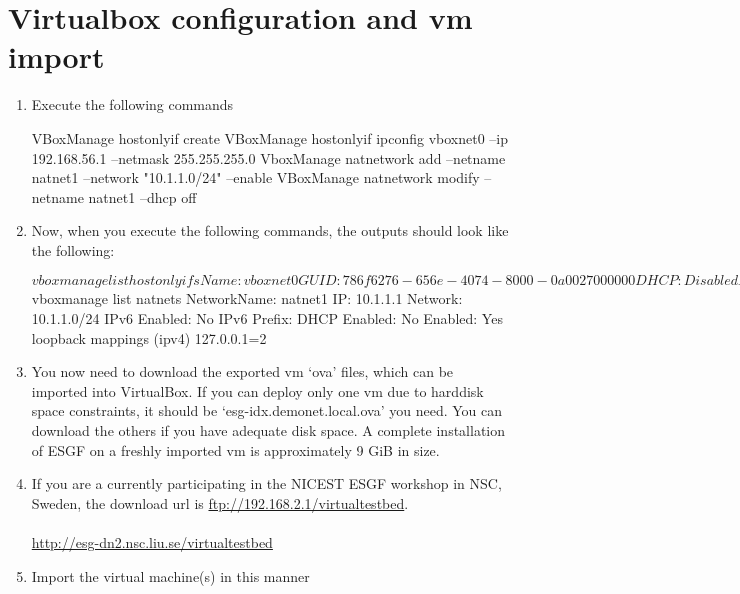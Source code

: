 \section{Virtualbox configuration and vm import}
\begin{enumerate}
\item Execute the following commands
\begin{tiny}
\begin{verbatimtab}[4]
VBoxManage hostonlyif create
VBoxManage hostonlyif ipconfig vboxnet0 --ip 192.168.56.1 --netmask 255.255.255.0
VboxManage natnetwork add --netname natnet1 --network "10.1.1.0/24" --enable
VBoxManage natnetwork modify --netname natnet1 --dhcp off
\end{verbatimtab}
\end{tiny}
\newpage
\item Now, when you execute the following commands, the outputs should look like the following:
\begin{verbatimtab}$ vboxmanage list hostonlyifs
Name:            vboxnet0
GUID:            786f6276-656e-4074-8000-0a0027000000
DHCP:            Disabled
IPAddress:       192.168.56.1
NetworkMask:     255.255.255.0
IPV6Address:     fe80:0000:0000:0000:0800:27ff:fe00:0000
IPV6NetworkMaskPrefixLength: 64
HardwareAddress: 0a:00:27:00:00:00
MediumType:      Ethernet
Status:          Up
VBoxNetworkName: HostInterfaceNetworking-vboxnet0

[pchengi@direwolf ~]$ vboxmanage list natnets
NetworkName:    natnet1
IP:             10.1.1.1
Network:        10.1.1.0/24
IPv6 Enabled:   No
IPv6 Prefix:    
DHCP Enabled:   No
Enabled:        Yes
loopback mappings (ipv4)
        127.0.0.1=2
\end{verbatimtab}
\item You now need to download the exported vm `ova' files, which can be imported into VirtualBox. If you can deploy only one vm due to harddisk space constraints, it should be `esg-idx.demonet.local.ova' you need. You can download the others if you have adequate disk space. A complete installation of ESGF on a freshly imported vm is approximately 9 GiB in size.
\item If you are a currently participating in the NICEST ESGF workshop in NSC, Sweden, the download url is \url{ftp://192.168.2.1/virtualtestbed}. \\  \\ \url{http://esg-dn2.nsc.liu.se/virtualtestbed}
\newpage
\item Import the virtual machine(s) in this manner
\begin{tiny}
\end{tiny}
\end{enumerate}
